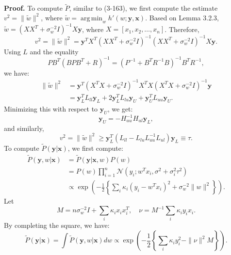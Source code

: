 \documentclass[12pt]{article}
\DeclareMathOperator*{\argmin}{arg\,min}
\begin{document}
	\textbf{Proof.} To compute $\tilde{P}$, similar to (3-163), we first compute the estimate $v^2 = \|\tilde{w}\|^2$, where $\tilde{w} = \argmin_w h'(w; \mathbf{y}, \mathbf{x})$. Based on Lemma 3.2.3, $\tilde{w} = (X X^T + \sigma_w^{-2} I)^{-1} X \mathbf{y}$, where $X = [x_1, x_2, \ldots, x_n]$. Therefore,
	\begin{equation}
		v^2 = \|\tilde{w}\|^2 = \mathbf{y}^T X^T (X X^T + \sigma_w^{-2} I)^{-1} (X X^T + \sigma_w^{-2} I)^{-1} X \mathbf{y}.
	\end{equation}
	Using $L$ and the equality \cite{golub2012matrix}
	\begin{equation}
		P B^T (B P B^T + R)^{-1} = (P^{-1} + B^T R^{-1} B)^{-1} B^T R^{-1},
	\end{equation}
	we have:
	\begin{align}
		\|\tilde{w}\|^2 &= \mathbf{y}^T (X^T X + \sigma_w^{-2} I)^{-1} X^T X (X^T X + \sigma_w^{-2} I)^{-1} \mathbf{y} \\
		&= \mathbf{y}_L^T L_{ll} \mathbf{y}_L + 2 \mathbf{y}_L^T L_{lu} \mathbf{y}_U + \mathbf{y}_U^T L_{uu} \mathbf{y}_U.
	\end{align}
	Minimizing this with respect to $\mathbf{y}_U$, we get:
	\begin{equation}
		\mathbf{y}_U = - H_{uu}^{-1} H_{ul} \mathbf{y}_L,
	\end{equation}
	and similarly,
	\begin{equation}
		v^2 = \|\tilde{w}\|^2 \ge \mathbf{y}_L^T (L_{ll} - L_{lu} L_{uu}^{-1} L_{ul}) \mathbf{y}_L \equiv \tau.
	\end{equation}
	To compute $\tilde{P}(\mathbf{y}|\mathbf{x})$, we first compute:
	\begin{align}
		\tilde{P}(\mathbf{y}, w|\mathbf{x}) &= \tilde{P}(\mathbf{y}|\mathbf{x}, w) P(w) \\
		&= P(w) \prod_{i=1}^{n} \mathcal{N}(y_i; w^T x_i, \sigma^2 + \sigma_i^2 \tau^2) \\
		&\propto \exp\left( -\frac{1}{2} \left\{ \sum_i \kappa_i (y_i - w^T x_i)^2 + \sigma_w^{-2} \|w\|^2 \right\} \right).
	\end{align}
	Let
	\begin{equation}
		M = n \sigma_w^{-2} I + \sum_i \kappa_i x_i x_i^T, \quad \nu = M^{-1} \sum_i \kappa_i y_i x_i.
	\end{equation}
	By completing the square, we have:
	\begin{equation}
		\tilde{P}(\mathbf{y}|\mathbf{x}) = \int \tilde{P}(\mathbf{y}, w|\mathbf{x}) dw \propto \exp\left( -\frac{1}{2} \left\{ \sum_i \kappa_i y_i^2 - \|\nu\|^2 M \right\} \right).
	\end{equation}
\end{document}
